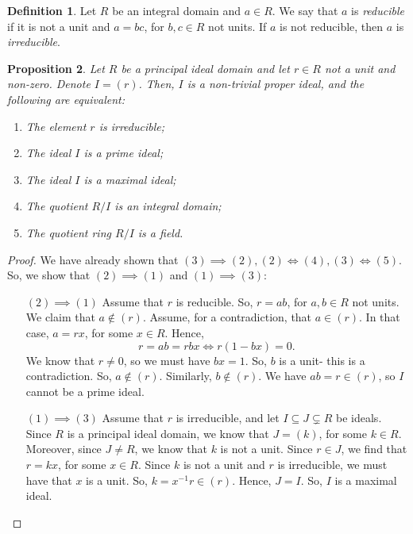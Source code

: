 \documentclass[a4paper, openany]{memoir}
\theoremstyle{definition}
\newtheorem{definition}{Definition}[section]
\theoremstyle{plain}
\newtheorem{proposition}[definition]{Proposition}
\begin{document}
    \begin{definition}
        Let $R$ be an integral domain and $a \in R$. We say that $a$ is \emph{reducible} if it is not a unit and $a = bc$, for $b, c \in R$ not units. If $a$ is not reducible, then $a$ is \emph{irreducible}.
    \end{definition}

    \begin{proposition}
        Let $R$ be a principal ideal domain and let $r \in R$ not a unit and non-zero. Denote $I = (r)$. Then, $I$ is a non-trivial proper ideal, and the following are equivalent:
        \begin{enumerate}
            \item The element $r$ is irreducible;
            \item The ideal $I$ is a prime ideal;
            \item The ideal $I$ is a maximal ideal;
            \item The quotient $R/I$ is an integral domain;
            \item The quotient ring $R/I$ is a field.
        \end{enumerate}
    \end{proposition}
    \begin{proof}
        We have already shown that $(3) \implies (2), (2) \iff (4), (3) \iff (5)$. So, we show that $(2) \implies (1)$ and $(1) \implies (3)$:
        \begin{itemize}
            \item[$(2) \implies (1)$] Assume that $r$ is reducible. So, $r = ab$, for $a, b \in R$ not units. We claim that $a \not\in (r)$. Assume, for a contradiction, that $a \in (r)$. In that case, $a = rx$, for some $x \in R$. Hence,
            \[r = ab = rbx \iff r (1 - bx) = 0.\]
            We know that $r \neq 0$, so we must have $bx = 1$. So, $b$ is a unit- this is a contradiction. So, $a \not\in (r)$. Similarly, $b \not\in (r)$. We have $ab = r \in (r)$, so $I$ cannot be a prime ideal.

            \item[$(1) \implies (3)$] Assume that $r$ is irreducible, and let $I \subseteq J \subsetneq R$ be ideals. Since $R$ is a principal ideal domain, we know that $J = (k)$, for some $k \in R$. Moreover, since $J \neq R$, we know that $k$ is not a unit. Since $r \in J$, we find that $r = kx$, for some $x \in R$. Since $k$ is not a unit and $r$ is irreducible, we must have that $x$ is a unit. So, $k = x^{-1} r \in (r)$. Hence, $J = I$. So, $I$ is a maximal ideal.
        \end{itemize}
    \end{proof}
\end{document}
